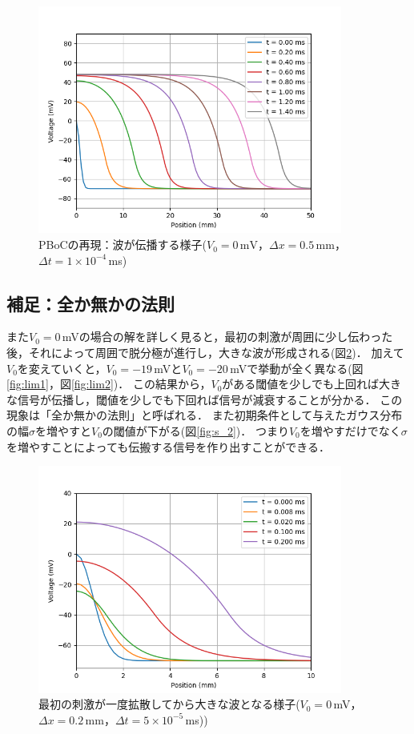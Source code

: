 \documentclass[a4paper,11pt]{jsarticle}
\begin{document}
\begin{figure}[htbp]
  \centering
  \includegraphics[width=10cm]{wave.png}
  \caption{PBoCの再現：波が伝播する様子($V_0=0\,\mathrm{mV}$，$\Delta x=0.5$\,mm，$\Delta t = 1\times 10^{-4}$\,ms)}
  \label{fig:wave}
\end{figure}

\subsection{補足：全か無かの法則}
また$V_0=0$\,mVの場合の解を詳しく見ると，最初の刺激が周囲に少し伝わった後，それによって周囲で脱分極が進行し，大きな波が形成される(図\ref{fig:attewave})．
加えて$V_0$を変えていくと，$V_0=-19$\,mVと$V_0=-20$\,mVで挙動が全く異なる(図\ref{fig:lim1}，図\ref{fig:lim2})．
この結果から，$V_0$がある閾値を少しでも上回れば大きな信号が伝播し，閾値を少しでも下回れば信号が減衰することが分かる．
この現象は「全か無かの法則」と呼ばれる．
また初期条件として与えたガウス分布の幅$\sigma$を増やすと$V_0$の閾値が下がる(図\ref{fig:s_2})．
つまり$V_0$を増やすだけでなく$\sigma$を増やすことによっても伝搬する信号を作り出すことができる．

\begin{figure}[htbp]
  \centering
  \includegraphics[width=10cm]{attewave.png}
  \caption{最初の刺激が一度拡散してから大きな波となる様子($V_0=0$\,mV，$\Delta x=0.2$\,mm，$\Delta t = 5\times 10^{-5}$\,ms))}
  \label{fig:attewave}
\end{figure}
\end{document}
